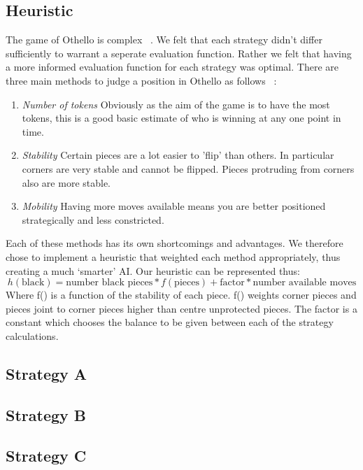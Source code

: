 \documentclass[12pt]{article}
\begin{document}
\subsection{Heuristic}
The game of Othello is complex ~\cite{post}. We felt that each strategy didn't differ sufficiently to warrant a seperate evaluation function. Rather we felt that having a more informed evaluation function for each strategy was optimal. There are three main methods to judge a position in Othello as follows ~\cite{strategy}:
\begin{enumerate}
\item \emph{Number of tokens} Obviously as the aim of the game is to have the most tokens, this is a good basic estimate of who is winning at any one point in time.
\item \emph{Stability} Certain pieces are a lot easier to 'flip' than others. In particular corners are very stable and cannot be flipped. Pieces protruding from corners also are more stable.
\item \emph{Mobility} Having more moves available means you are better positioned strategically and less constricted.
\end{enumerate}
Each of these methods has its own shortcomings and advantages. We therefore chose to implement a heuristic that weighted each method appropriately, thus creating a much `smarter' AI.
Our heuristic can be represented thus:
\begin{equation}
h(\mbox{black}) = \mbox{number black pieces}*f(\mbox{pieces}) + \mbox{factor}*\mbox{number available moves}
\end{equation}
Where f() is a function of the stability of each piece. f() weights corner pieces and pieces joint to corner pieces higher than centre unprotected pieces. The factor is a constant which chooses the balance to be given between each of the strategy calculations.

\subsection{Strategy A}

\subsection{Strategy B}

\subsection{Strategy C}
\end{document}
